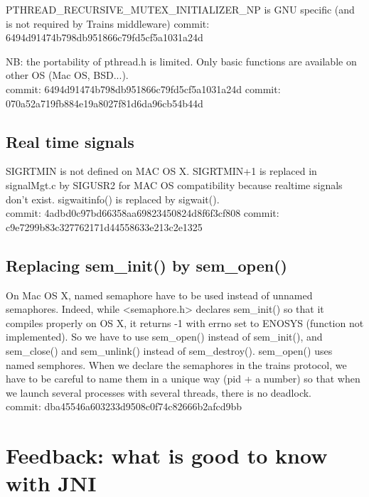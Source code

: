 \documentclass[a4paper,10pt]{report}
\begin{document}
    PTHREAD\_RECURSIVE\_MUTEX\_INITIALIZER\_NP is GNU specific (and
    is not required by Trains middleware)
    commit: 6494d91474b798db951866c79fd5cf5a1031a24d
    
    NB: the portability of pthread.h is limited. Only basic functions are
    available on other OS (Mac OS, BSD...).\\
    
    commit: 6494d91474b798db951866c79fd5cf5a1031a24d
    commit: 070a52a719fb884e19a8027f81d6da96cb54b44d 
    

\subsection{Real time signals}
    SIGRTMIN is not defined on MAC OS X.
    SIGRTMIN+1 is replaced in signalMgt.c by SIGUSR2 for MAC OS
    compatibility because realtime signals don't exist.
    sigwaitinfo() is replaced by sigwait().\\

    commit: 4adbd0c97bd66358aa69823450824d8f6f3cf808
    commit: c9e7299b83c327762171d44558633e213c2e1325

\subsection{Replacing sem\_init() by sem\_open()}
    
    On Mac OS X, named semaphore have to be used instead of unnamed
    semaphores. Indeed, while <semaphore.h> declares sem\_init() so that it
    compiles properly on OS X, it returns -1 with errno set to ENOSYS
    (function not implemented).
    So we have to use sem\_open() instead of sem\_init(), and sem\_close() and
    sem\_unlink() instead of sem\_destroy().
    sem\_open() uses named semphores. When we declare the semaphores in the trains protocol, 
    we have to be careful to name them in a unique way (pid + a number) so that when we launch
    several processes with several threads, there is no deadlock.\\
 
    commit: dba45546a603233d9508c0f74c82666b2afcd9bb

\section{Feedback: what is good to know with JNI}

\lstset{language=C}
\lstset{commentstyle=\textit} 
\begin{lstlisting}
\end{lstlisting}
\end{document}
